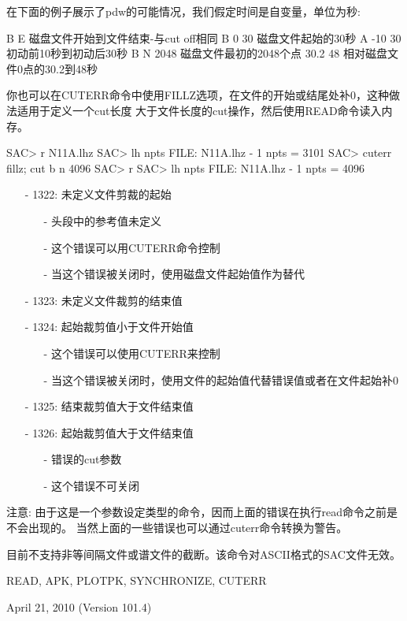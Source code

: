 在下面的例子展示了pdw的可能情况，我们假定时间是自变量，单位为秒:
\begin{SACCode}
 B E  磁盘文件开始到文件结束-与cut off相同
 B 0 30  磁盘文件起始的30秒
 A -10 30  初动前10秒到初动后30秒
 B N 2048   磁盘文件最初的2048个点
 30.2 48  相对磁盘文件0点的30.2到48秒
\end{SACCode}
你也可以在CUTERR命令中使用FILLZ选项，在文件的开始或结尾处补0，这种做法适用于定义一个cut长度
大于文件长度的cut操作，然后使用READ命令读入内存。
\begin{SACCode}
SAC> r N11A.lhz
SAC> lh npts
FILE: N11A.lhz - 1
npts = 3101
SAC> cuterr fillz; cut b n 4096
SAC> r
SAC> lh npts
FILE: N11A.lhz - 1
npts = 4096
\end{SACCode}
 
\begin{itemize}
\item[-]1322: 未定义文件剪裁的起始
	\begin{itemize}
  	\item[-]头段中的参考值未定义
	\item[-]这个错误可以用CUTERR命令控制
	\item[-]当这个错误被关闭时，使用磁盘文件起始值作为替代
	\end{itemize}
\item[-]1323: 未定义文件裁剪的结束值
\item[-]1324: 起始裁剪值小于文件开始值
	\begin{itemize}
	\item[-] 这个错误可以使用CUTERR来控制
	\item[-] 当这个错误被关闭时，使用文件的起始值代替错误值或者在文件起始补0
	\end{itemize}
\item[-]1325: 结束裁剪值大于文件结束值
\item[-]1326: 起始裁剪值大于文件结束值
	\begin{itemize}
	\item[-]错误的cut参数
	\item[-]这个错误不可关闭
	\end{itemize}
\end{itemize}

注意: 由于这是一个参数设定类型的命令，因而上面的错误在执行read命令之前是不会出现的。
当然上面的一些错误也可以通过cuterr命令转换为警告。

目前不支持非等间隔文件或谱文件的截断。该命令对ASCII格式的SAC文件无效。

READ, APK, PLOTPK, SYNCHRONIZE, CUTERR

April 21, 2010 (Version 101.4)
